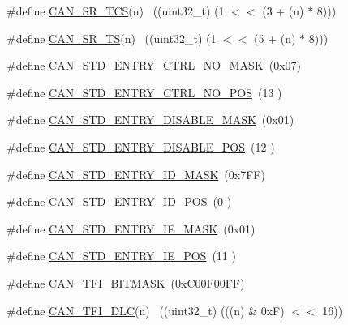 \begin{DoxyCompactItemize}
\item 
\#define \hyperlink{group__CAN__17XX__40XX_ga02aba0469d2a57a41471a267d535a153}{C\+A\+N\+\_\+\+S\+R\+\_\+\+T\+CS}(n)      ~((uint32\+\_\+t) (1 $<$$<$ (3 + (n) $\ast$ 8)))
\item 
\#define \hyperlink{group__CAN__17XX__40XX_gaef3bbe85b4a44da195061d4a31027460}{C\+A\+N\+\_\+\+S\+R\+\_\+\+TS}(n)        ~((uint32\+\_\+t) (1 $<$$<$ (5 + (n) $\ast$ 8)))
\item 
\#define \hyperlink{group__CAN__17XX__40XX_ga349506f245dce5ac65e33b622053916c}{C\+A\+N\+\_\+\+S\+T\+D\+\_\+\+E\+N\+T\+R\+Y\+\_\+\+C\+T\+R\+L\+\_\+\+N\+O\+\_\+\+M\+A\+SK}~(0x07)
\item 
\#define \hyperlink{group__CAN__17XX__40XX_ga61ae528adf71eb852cbd646df9dfa702}{C\+A\+N\+\_\+\+S\+T\+D\+\_\+\+E\+N\+T\+R\+Y\+\_\+\+C\+T\+R\+L\+\_\+\+N\+O\+\_\+\+P\+OS}~(13 )
\item 
\#define \hyperlink{group__CAN__17XX__40XX_ga8c813fa1c0a9066aeacd15a7d28c4049}{C\+A\+N\+\_\+\+S\+T\+D\+\_\+\+E\+N\+T\+R\+Y\+\_\+\+D\+I\+S\+A\+B\+L\+E\+\_\+\+M\+A\+SK}~(0x01)
\item 
\#define \hyperlink{group__CAN__17XX__40XX_ga222c235d9fc30777d2380f5fcc843c8a}{C\+A\+N\+\_\+\+S\+T\+D\+\_\+\+E\+N\+T\+R\+Y\+\_\+\+D\+I\+S\+A\+B\+L\+E\+\_\+\+P\+OS}~(12 )
\item 
\#define \hyperlink{group__CAN__17XX__40XX_ga29ad79d718c09251fa620d0eb979dd83}{C\+A\+N\+\_\+\+S\+T\+D\+\_\+\+E\+N\+T\+R\+Y\+\_\+\+I\+D\+\_\+\+M\+A\+SK}~(0x7\+F\+F)
\item 
\#define \hyperlink{group__CAN__17XX__40XX_ga97b02bf9ac5d417eb24c951c8838257c}{C\+A\+N\+\_\+\+S\+T\+D\+\_\+\+E\+N\+T\+R\+Y\+\_\+\+I\+D\+\_\+\+P\+OS}~(0  )
\item 
\#define \hyperlink{group__CAN__17XX__40XX_gac71896bdcee29b8bd5558220ba13088c}{C\+A\+N\+\_\+\+S\+T\+D\+\_\+\+E\+N\+T\+R\+Y\+\_\+\+I\+E\+\_\+\+M\+A\+SK}~(0x01)
\item 
\#define \hyperlink{group__CAN__17XX__40XX_ga3f2146c4a801f8ec202db8670a808ca3}{C\+A\+N\+\_\+\+S\+T\+D\+\_\+\+E\+N\+T\+R\+Y\+\_\+\+I\+E\+\_\+\+P\+OS}~(11 )
\item 
\#define \hyperlink{group__CAN__17XX__40XX_ga88986a2ea8f1ed5ff9abdfb2ae6a1f72}{C\+A\+N\+\_\+\+T\+F\+I\+\_\+\+B\+I\+T\+M\+A\+SK}~(0x\+C00\+F00\+F\+F)
\item 
\#define \hyperlink{group__CAN__17XX__40XX_gaf9aac352f455919f338326a7bb485785}{C\+A\+N\+\_\+\+T\+F\+I\+\_\+\+D\+LC}(n)                ~((uint32\+\_\+t) (((n) \& 0x\+F) $<$$<$ 16))
\item 
$$
\end{DoxyCompactItemize}

